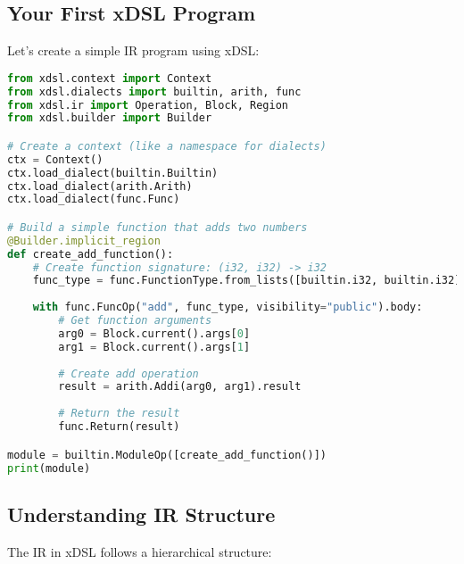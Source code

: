 \documentclass[11pt,a4paper]{article}
\begin{document}
\subsection{Your First xDSL Program}

Let's create a simple IR program using xDSL:

\begin{lstlisting}[language=Python, caption=Creating IR in xDSL]
from xdsl.context import Context
from xdsl.dialects import builtin, arith, func
from xdsl.ir import Operation, Block, Region
from xdsl.builder import Builder

# Create a context (like a namespace for dialects)
ctx = Context()
ctx.load_dialect(builtin.Builtin)
ctx.load_dialect(arith.Arith)
ctx.load_dialect(func.Func)

# Build a simple function that adds two numbers
@Builder.implicit_region
def create_add_function():
    # Create function signature: (i32, i32) -> i32
    func_type = func.FunctionType.from_lists([builtin.i32, builtin.i32], [builtin.i32])
    
    with func.FuncOp("add", func_type, visibility="public").body:
        # Get function arguments
        arg0 = Block.current().args[0]
        arg1 = Block.current().args[1]
        
        # Create add operation
        result = arith.Addi(arg0, arg1).result
        
        # Return the result
        func.Return(result)

module = builtin.ModuleOp([create_add_function()])
print(module)
\end{lstlisting}

\subsection{Understanding IR Structure}

The IR in xDSL follows a hierarchical structure:

\end{document}
